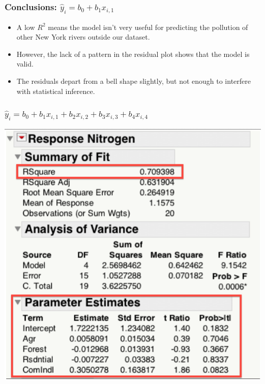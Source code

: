 \documentclass[handout]{beamer}\usepackage{graphicx, color}
\providecommand{\wh}[1]{\widehat{#1}}
\numberwithin{equation}{section}
\begin{document}
\begin{frame}
\frametitle{Conclusions: $\wh{y}_i = b_0 + b_1 x_{i, 1} $}
\begin{itemize}
\pause \item A low $R^2$ means the model isn't very useful for predicting the pollution of other New York rivers outside our dataset.
\pause \item However, the lack of a pattern in the residual plot shows that the model is valid.
\pause \item The residuals depart from a bell shape slightly, but not enough to interfere with statistical inference.
\end{itemize}
\end{frame}


\begin{frame}
\frametitle{$\wh{y}_i = b_0 + b_1 x_{i, 1}  + b_2 x_{i, 2} + b_3 x_{i, 3} + b_4 x_{i, 4}  $}
 \includegraphics{../../fig/riversfullmodeloutput.png}

\end{frame}
\end{document}
